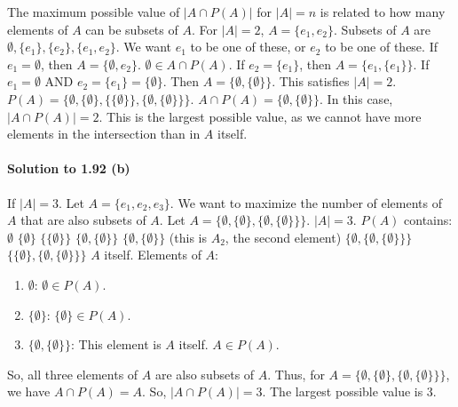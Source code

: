 \documentclass{article}
\begin{document}
\begin{itemize}
\begin{itemize}
\begin{itemize}
The maximum possible value of $|A \cap P(A)|$ for $|A|=n$ is related to how many elements of $A$ can be subsets of $A$.
For $|A|=2$, $A=\{e_1, e_2\}$.
Subsets of $A$ are $\emptyset, \{e_1\}, \{e_2\}, \{e_1, e_2\}$.
We want $e_1$ to be one of these, or $e_2$ to be one of these.
If $e_1 = \emptyset$, then $A = \{\emptyset, e_2\}$. $\emptyset \in A \cap P(A)$.
If $e_2 = \{e_1\}$, then $A = \{e_1, \{e_1\}\}$.
If $e_1 = \emptyset$ AND $e_2 = \{e_1\} = \{\emptyset\}$.
Then $A = \{\emptyset, \{\emptyset\}\}$. This satisfies $|A|=2$.
$P(A) = \{\emptyset, \{\emptyset\}, \{\{\emptyset\}\}, \{\emptyset, \{\emptyset\}\}\}$.
$A \cap P(A) = \{\emptyset, \{\emptyset\}\}$.
In this case, $|A \cap P(A)| = 2$. This is the largest possible value, as we cannot have more elements in the intersection than in $A$ itself.

\paragraph*{Solution to 1.92 (b)}
If $|A| = 3$. Let $A = \{e_1, e_2, e_3\}$.
We want to maximize the number of elements of $A$ that are also subsets of $A$.
Let $A = \{\emptyset, \{\emptyset\}, \{\emptyset, \{\emptyset\}\}\}$.
$|A|=3$.
$P(A)$ contains:
$\emptyset$
$\{\emptyset\}$
$\{\{\emptyset\}\}$
$\{\emptyset, \{\emptyset\}\}$
$\{\emptyset, \{\emptyset\}\}$ (this is $A_2$, the second element)
$\{\emptyset, \{\emptyset, \{\emptyset\}\}\}$
$\{\{\emptyset\}, \{\emptyset, \{\emptyset\}\}\}$
$A$ itself.
Elements of $A$:
\begin{enumerate}
    \item $\emptyset$: $\emptyset \in P(A)$.
    \item $\{\emptyset\}$: $\{\emptyset\} \in P(A)$.
    \item $\{\emptyset, \{\emptyset\}\}$: This element is $A$ itself. $A \in P(A)$.
\end{enumerate}
So, all three elements of $A$ are also subsets of $A$.
Thus, for $A = \{\emptyset, \{\emptyset\}, \{\emptyset, \{\emptyset\}\}\}$, we have $A \cap P(A) = A$.
So, $|A \cap P(A)| = 3$.
The largest possible value is 3.


\end{itemize}
\end{itemize}
\end{itemize}
\end{document}
